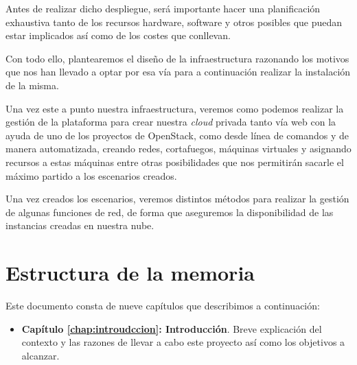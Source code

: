 Antes de realizar dicho despliegue, será importante hacer una planificación exhaustiva tanto de los recursos hardware, software y otros posibles que puedan estar implicados así como de los costes que conllevan.

Con todo ello, plantearemos el diseño de la infraestructura razonando los motivos que nos han llevado a optar por esa vía para a continuación realizar la instalación de la misma.


Una vez este a punto nuestra infraestructura, veremos como podemos realizar la gestión de la plataforma para crear nuestra \textit{cloud} privada tanto vía web con la ayuda de uno de los proyectos de OpenStack, como desde línea de comandos y de manera automatizada, creando redes, cortafuegos, máquinas virtuales y asignando recursos a estas máquinas entre otras posibilidades que nos permitirán sacarle el máximo partido a los escenarios creados.

Una vez creados los escenarios, veremos distintos métodos para realizar la gestión de algunas funciones de red, de forma que aseguremos la disponibilidad de las instancias creadas en nuestra nube.


\section{Estructura de la memoria} \label{subchap:estrucutramemoria}

Este documento consta de nueve capítulos que describimos a continuación:

\begin{itemize}
\item \textbf{Capítulo \ref{chap:introudccion}: Introducción}. Breve explicación del contexto y las razones de llevar a cabo este proyecto así como los objetivos a alcanzar.
\end{itemize}

